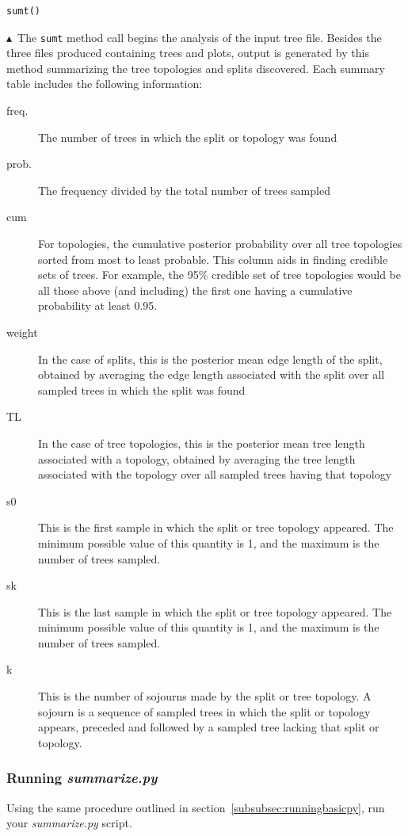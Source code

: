 \documentclass[10pt]{article}
\newcommand{\pathname}[1]{{\em #1}}				%
\newcommand{\cmd}[1]{{\tt \small #1}\index{#1}}	%
\newcommand{\pointup}{$\blacktriangle$}
\begin{document}
\begin{samepage}
\begin{verbatim}
sumt()
\end{verbatim}
\pointup\ The \cmd{sumt} method call begins the analysis of the input tree file. Besides the three files produced containing trees and plots, output is generated by this method summarizing the tree topologies and splits discovered. Each summary table includes the following information:
\end{samepage}
\begin{description}
\item[freq.] The number of trees in which the split or topology was found
\item[prob.] The frequency divided by the total number of trees sampled
\item[cum] For topologies, the cumulative posterior probability over all tree topologies sorted from most to least probable. This column aids in finding credible sets of trees. For example, the 95\% credible set of tree topologies would be all those above (and including) the first one having a cumulative probability at least 0.95.
\item[weight] In the case of splits, this is the posterior mean edge length of the split, obtained by averaging the edge length associated with the split over all sampled trees in which the split was found
\item[TL] In the case of tree topologies, this is the posterior mean tree length associated with a topology, obtained by averaging the tree length associated with the topology over all sampled trees having that topology
\item[s0] This is the first sample in which the split or tree topology appeared. The minimum possible value of this quantity is 1, and the maximum is the number of trees sampled.
\item[sk] This is the last sample in which the split or tree topology appeared. The minimum possible value of this quantity is 1, and the maximum is the number of trees sampled.
\item[k] This is the number of sojourns made by the split or tree topology. A sojourn is a sequence of sampled trees in which the split or topology appears, preceded and followed by a sampled tree lacking that split or topology.
\end{description}

\subsubsection{Running \pathname{summarize.py}}
Using the same procedure outlined in section~\ref{subsubsec:runningbasicpy}, run your \pathname{summarize.py} script. 
\end{document}
